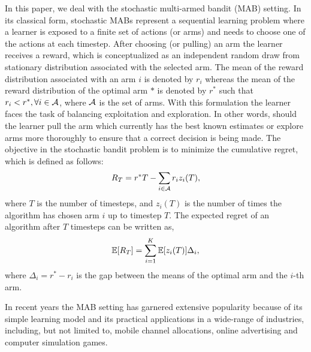 In this paper, we deal with the stochastic multi-armed bandit (MAB) setting. In its classical form, stochastic MABs represent a sequential learning problem where a learner is exposed to a finite set of actions (or arms) and needs to choose one of the actions at each timestep. After choosing (or pulling) an arm the learner  receives a reward, which is conceptualized as an independent random draw from stationary distribution associated with the selected arm. 
The mean of the reward distribution associated with an arm $i$ is denoted by $r_i$ whereas the mean of the reward distribution of the optimal arm $*$ is denoted by $r^*$ such that $r_i < r^*, \forall i\in \mathcal{A}$, where $\mathcal{A}$ is the set of arms. With this formulation the learner faces the task of balancing exploitation and exploration. In other words, should the learner pull the arm which currently has the best known estimates or explore arms more thoroughly to ensure that a correct decision is being made. The objective in the stochastic bandit problem is to minimize the cumulative regret, which is defined as follows:
\begin{align*}
R_{T}=r^{*}T - \sum_{i\in \mathcal{A}} r_{i}z_{i}(T),
\end{align*}
where $T$ is the number of timesteps, and  $z_{i}(T)$ is the number of times the algorithm has chosen arm $i$ up to timestep $T$.
The expected regret of an algorithm after $T$ timesteps can be written as,
\begin{align*}
\mathbb{E}[R_{T}]= \sum_{i=1}^K \mathbb{E}[z_i (T)] \Delta_i,
\end{align*}
where $\Delta_{i}=r^{*}-r_{i}$ is the gap between the means of the optimal arm and the $i$-th arm.


	In recent years the MAB setting has garnered extensive popularity because of its simple learning  model and its practical applications in a wide-range of industries, including, but not limited to, mobile channel allocations, online advertising and computer simulation games. 
	
